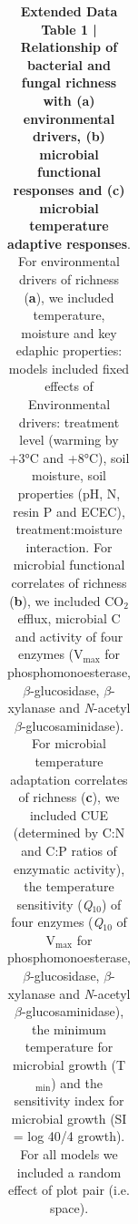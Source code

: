 \documentclass[
  letterpaper,
  DIV=11,
  numbers=noendperiod]{scrartcl}
\begin{document}
\begin{table}[H]

\caption{\textbf{Extended Data Table 1 |} \textbf{Relationship of bacterial and fungal richness with (a) environmental drivers, (b) microbial functional responses and (c) microbial temperature adaptive responses}. For environmental drivers of richness (\textbf{a}), we included temperature, moisture and key edaphic properties: models included fixed effects of Environmental drivers: treatment level (warming by +3°C and +8°C), soil moisture, soil properties (pH, N, resin P and ECEC), treatment:moisture interaction. For microbial functional correlates of richness (\textbf{b}), we included CO$_{2}$ efflux, microbial C and activity of four enzymes (V$_{\mathrm{max}}$ for phosphomonoesterase, $\beta$-glucosidase, $\beta$-xylanase and \textsl{N}-acetyl $\beta$-glucosaminidase). For microbial temperature adaptation correlates of richness (\textbf{c}), we included CUE (determined by C:N and C:P ratios of enzymatic activity), the temperature sensitivity (\textsl{Q}$_{10}$) of four enzymes (\textsl{Q}$_{10}$ of V$_{\mathrm{max}}$ for phosphomonoesterase, $\beta$-glucosidase, $\beta$-xylanase and \textsl{N}-acetyl $\beta$-glucosaminidase), the minimum temperature for microbial growth (T$_{\mathrm{min}}$) and the sensitivity index for microbial growth (SI = log 40/4 growth). For all models we included a random effect of plot pair (i.e. space).}
\centering
\fontsize{8}{10}\selectfont
\begin{tabular}[t]{lccccc}


\end{tabular}
\end{table}
\end{document}
